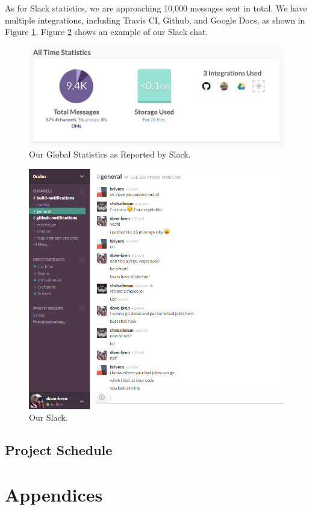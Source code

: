 \documentclass[12pt]{article}
\begin{document}
As for Slack statistics, we are approaching 10,000 messages sent in total. We have multiple integrations, including Travis CI, Github, and Google Docs, as shown in Figure \ref{slack:stats}. Figure \ref{slack:window} shows an example of our Slack chat.

\begin{figure}[H]
        \centering
        \includegraphics[width=4.5in]{slack.png}
        \caption{Our Global Statistics as Reported by Slack.}\label{slack:stats}
\end{figure}

\begin{figure}[H]
        \centering
        \includegraphics[width=4.5in]{slack-window.png}
        \caption{Our Slack.}\label{slack:window}
\end{figure}


\subsection{Project Schedule} %
\section{Appendices}








\end{document}
